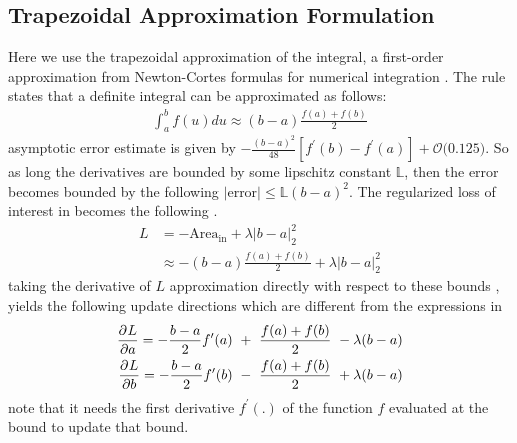 \subsection{Trapezoidal Approximation Formulation} 
Here we use the trapezoidal approximation of the integral, a first-order approximation from Newton-Cortes formulas for numerical integration \cite{numerical}. The rule states that a definite integral can be approximated as follows: 
\begin{equation}
\begin{aligned} 
\int_{a}^{b}f(u)du \approx (b-a)\frac{f(a)+f(b)}{2}
\label{eq:trapezoidal-integration}
\end{aligned}
\end{equation}
asymptotic error estimate is given by $-\frac { ( b - a ) ^ { 2 } } { 48 } \left[ f ^ { \prime } ( b ) - f ^ { \prime } ( a ) \right] + \mathcal{O} \Big( 0.125 \Big)$. So as long the derivatives are bounded by some lipschitz constant $\mathbb{L}$, then the error becomes bounded by the following $|\text{error}| \leq \mathbb{L}( b - a ) ^ { 2 }  $. The regularized loss of interest in \eqLabel{\ref{eq:loss-naive-sup}} becomes the following .
\begin{equation}
\begin{aligned} 
L &= -\text{Area}_{\text{in}} + \lambda \left| b-a\right|_{2}^{2}\\ &\approx -(b-a)\frac{f(a)+f(b)}{2} + \lambda \left| b-a\right|_{2}^{2}  
\label{eq:loss-trap-1}
\end{aligned}
\end{equation}
taking the derivative of $L$ approximation directly with respect to these bounds , yields the following update directions which are different from the expressions in \eqLabel{\ref{eq:update-naive-1-sup}}
\begin{equation}
\begin{aligned} 
\frac{\partial^{} L}{\partial a} = -\frac{b - a}{2}f^{\prime}(a)~ +~\frac{f(a) + f(b)}{2}  ~- \lambda (b-a)\\
\frac{\partial^{} L}{\partial b} = -\frac{b - a}{2}f^{\prime}(b) ~-~\frac{f(a) + f(b)}{2}  ~+ \lambda (b-a)\\
\label{eq:update-trap-1}
\end{aligned}
\end{equation}
note that it needs the first derivative $f^{\prime}(.)$ of the function $f$ evaluated at the bound to update that bound.

